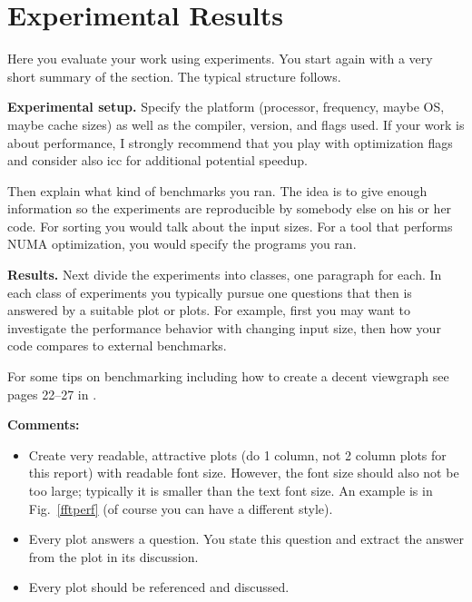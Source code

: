 \documentclass[letterpaper]{article}
\newcommand{\mypar}[1]{{\bf #1.}}
\begin{document}
\section{Experimental Results}\label{sec:exp}

Here you evaluate your work using experiments. You start again with a
very short summary of the section. The typical structure follows.

\mypar{Experimental setup} Specify the platform (processor, frequency, maybe OS, maybe cache sizes)
as well as the compiler, version, and flags used. If your work is about performance, 
I strongly recommend that you play with optimization flags and consider also icc for additional potential speedup.

Then explain what kind of benchmarks you ran. The idea is to give enough information so the experiments are reproducible by somebody else on his or her code.
For sorting you would talk about the input sizes. For a tool that performs NUMA optimization, you would specify the programs you ran.

\mypar{Results}
Next divide the experiments into classes, one paragraph for each. In each class of experiments you typically pursue one questions that then is answered by a suitable plot or plots. For example, first you may want to investigate the performance behavior with changing input size, then how your code compares to external benchmarks.

For some tips on benchmarking including how to create a decent viewgraph see pages 22--27 in \cite{Pueschel:10}.

{\bf Comments:}
\begin{itemize}
\item Create very readable, attractive plots (do 1 column, not 2 column plots
for this report) with readable font size. However, the font size should also not be too large; typically it is smaller than the text font size.
An example is in Fig.~\ref{fftperf} (of course you can have a different style).
\item Every plot answers a question. You state this question and extract the
answer from the plot in its discussion.
\item Every plot should be referenced and discussed.
\end{itemize}
\end{document}
